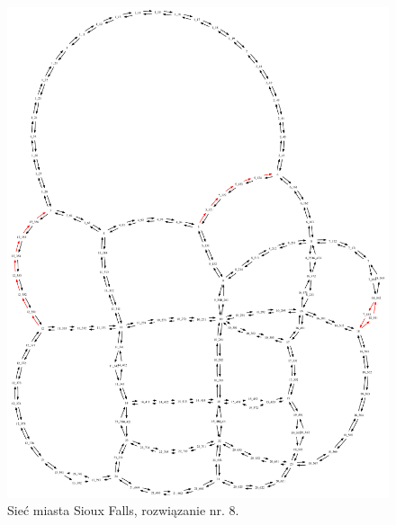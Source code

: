 \documentclass[twoside,12pt]{report}
\begin{document}
\begin{figure}[ht]
\centering
\includegraphics[totalheight=0.580\textheight, angle=90]{img/sioux-out/8/network2}
\caption{Sieć miasta Sioux Falls, rozwiązanie nr. 8.}
\label{sioux8}
\end{figure}
\end{document}
